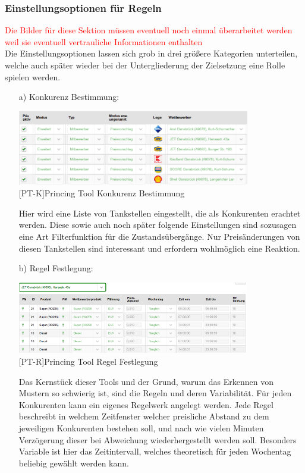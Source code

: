 \documentclass[12pt,a4paper,bibliography=totocnumbered,listof=totocnumbered]{scrartcl}
\begin{document}
\subsubsection{Einstellungsoptionen für Regeln}
\textcolor{red}{Die Bilder für diese Sektion müssen eventuell noch einmal überarbeitet werden weil sie eventuell vertrauliche Informationen enthalten}\\
Die Einstellungsoptionen lassen sich grob in drei größere Kategorien unterteilen, welche auch später wieder bei der Untergliederung der Zielsetzung eine Rolle spielen werden.
\begin{enumerate}
\item[a)] Konkurenz Bestimmung:\\ 

\begin{center}
	\includegraphics[width=0.8\textwidth, draft]{Bilder/konkurenz.png}\\
	[PT-K]{Princing Tool Konkurenz Bestimmung}
	\label{fig:PT-K}
\end{center}
Hier wird eine Liste von Tankstellen eingestellt, die als Konkurenten erachtet werden. Diese sowie auch noch später folgende Einstellungen sind sozusagen eine Art Filterfunktion für die Zustandsübergänge. Nur Preisänderungen von diesen Tankstellen sind interessant und erfordern wohlmöglich eine Reaktion.

\item[b)] Regel Festlegung:\\
\begin{center}
	\includegraphics[width=0.8\textwidth, draft]{Bilder/regeln2.png}\\
	[PT-R]{Princing Tool Regel Festlegung}
	\label{fig:PT-R}
\end{center}
Das Kernstück dieser Tools und der Grund, warum das Erkennen von Mustern so schwierig ist, sind die Regeln und deren Variabilität. Für jeden Konkurenten kann ein eigenes Regelwerk angelegt werden. Jede Regel beschreibt in welchem Zeitfenster welcher preisliche Abstand zu dem jeweiligen Konkurenten bestehen soll, und nach wie vielen Minuten Verzögerung dieser bei Abweichung wiederhergestellt werden soll. Besonders Variable ist hier das Zeitintervall, welches theoretisch für jeden Wochentag beliebig gewählt werden kann.


\end{enumerate}
\end{document}
